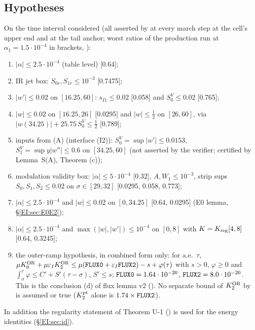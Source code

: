 \documentclass[11pt]{article}
\begin{document}
\subsection{Hypotheses}\label{EI:sec:hyp}
On the time interval considered (all asserted by  at every march step at the cell's upper end and at the tail anchor; worst ratios of the production run at $\alpha_1=1.5\cdot10^{-4}$ in brackets,  ):
\begin{enumerate}[label=\textup{(B-\alph*)},leftmargin=3.2em]
\item $|\alpha|\le2.5\cdot10^{-4}$ (table level) [0.64];
\item IR jet box: $S_{0r},S_{1r}\le10^{-3}$ [0.7475];
\item $|w'|\le0.02$ on $[16.25,60]$: $s_{I1}\le0.02$ [0.058] and $S^V_0\le0.02$ [0.765];
\item $|w|\le0.02$ on $[16.25,26]$ [0.0295] and $|w|\le\frac12$ on $[26,60]$, via $|w(34.25)|+25.75\,S^V_0\le\frac12$ [0.789];
\item inputs from (A) (interface (I2)): $S^V_0=\sup|w'|\le0.0153$, $S^V_1=\sup y|w''|\le0.6$ on $[34.25,60]$ (not asserted by the verifier; certified by Lemma~S(A),  Theorem (c));
\item modulation validity box: $|\alpha|\le5\cdot10^{-4}$ [0.32], $A,W_1\le10^{-3}$, strip sups $S_0,S_1,S_2\le0.02$ on $\sigma\in[29,32]$ [0.0295, 0.058, 0.773];
\item[(E0)] $|\alpha|\le2.5\cdot10^{-4}$ and $|w|\le0.02$ on $[0,34.25]$ [0.64, 0.0295] (E0 lemma, \S\ref{EI:sec:E0E2});
\item[(E2)] $|\alpha|\le2.5\cdot10^{-4}$ and $\max(|w|,|w'|)\le10^{-4}$ on $[0,8]$ with $K=K_{\rm reg}[4,8]$ [0.64, 0.3245];
\item[(I3$'$)] the outer-ramp hypothesis, in combined form only: for a.e.\ $\tau$, $\mu K_0^{\OR}+\mu\eI K_2^{\OR}\le\mu(\fn{FLUX0}+\eI\fn{FLUX2})-s+\varphi(\tau)$ with $s>0$, $\varphi\ge0$ and $\int_\sigma^\tau\varphi\le C'+S'(\tau-\sigma)$, $S'\le s$; $\fn{FLUX0}=1.64\cdot10^{-20}$, $\fn{FLUX2}=8.0\cdot10^{-20}$. This is the conclusion (d) of flux lemma v2 (). No separate bound of $K_2^{\mathrm{OR}}$ by  is assumed or true ($K_2^{\rm pt}$ alone is $1.74\times\fn{FLUX2}$).
\end{enumerate}
In addition the regularity statement of Theorem U-1 () is used for the energy identities (\S\ref{EI:sec:id}).
\end{document}

